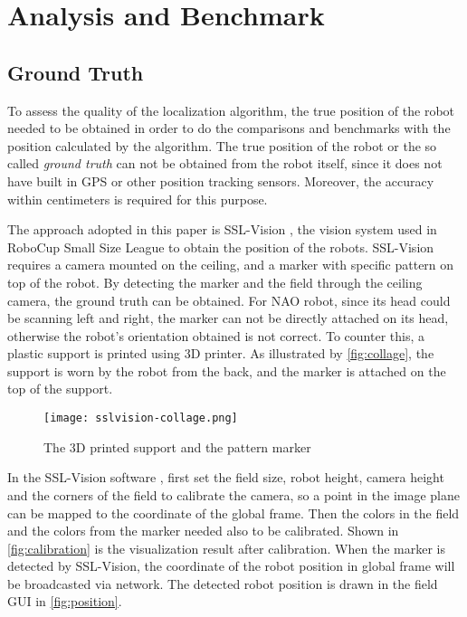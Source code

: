 \chapter{Analysis and Benchmark\label{cha:chapter6}}

\section{Ground Truth}\label{sub:ground truth}
To assess the quality of the localization algorithm, the true position of the robot needed to be obtained in order to do the comparisons and benchmarks with the position calculated by the algorithm. The true position of the robot or the so called \textit{ground truth} can not be obtained from the robot itself, since it does not have built in \gls{GPS} or other position tracking sensors. Moreover, the accuracy within centimeters is required for this purpose. 

The approach adopted in this paper is SSL-Vision \cite{zickler2010ssl}, the vision system used in RoboCup Small Size League to obtain the position of the robots. SSL-Vision requires a camera mounted on the ceiling, and a marker with specific pattern on top of the robot. By detecting the marker and the field through the ceiling camera, the ground truth can be obtained. For NAO robot, since its head could be scanning left and right, the marker can not be directly attached on its head, otherwise the robot's orientation obtained is not correct. To counter this, a plastic support is printed using 3D printer. As illustrated by \autoref{fig:collage}, the support is worn by the robot from the back, and the marker is attached on the top of the support.

\begin{figure}[h!]
  \centering
  \texttt{[image: sslvision-collage.png]}
  \caption{The 3D printed support and the pattern marker}
  \label{fig:collage}
\end{figure}

In the SSL-Vision software \cite{sslvision_yuan}, first set the field size, robot height, camera height and the corners of the field to calibrate the camera, so a point in the image plane can be mapped to the coordinate of the global frame. Then the colors in the field and the colors from the marker needed also to be calibrated. Shown in \autoref{fig:calibration} is the visualization result after calibration. When the marker is detected by SSL-Vision, the coordinate of the robot position in global frame will be broadcasted via network. The detected robot position is drawn in the field GUI in \autoref{fig:position}.\\

